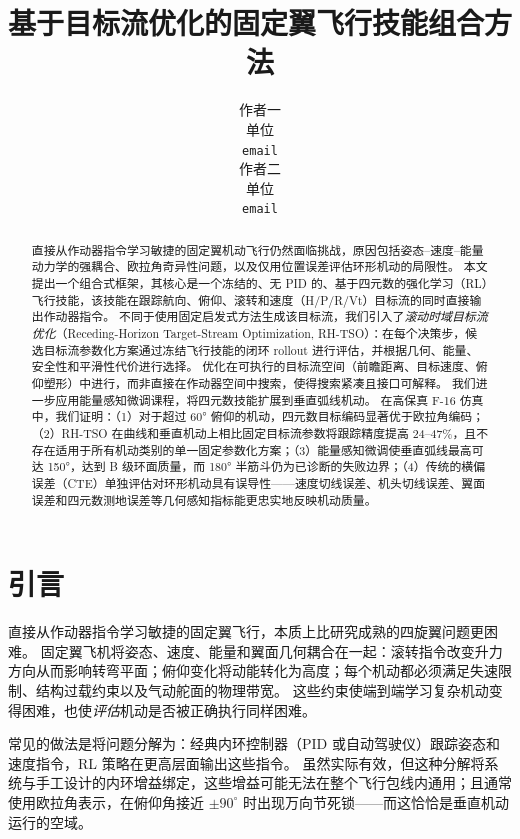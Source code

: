 \documentclass{article}
\title{基于目标流优化的固定翼飞行技能组合方法}
\author{
  作者一\\
  单位\\
  \texttt{email} \\
  \And
  作者二\\
  单位\\
  \texttt{email} \\
}
\begin{document}
\maketitle


\begin{abstract}
  直接从作动器指令学习敏捷的固定翼机动飞行仍然面临挑战，原因包括姿态--速度--能量动力学的强耦合、欧拉角奇异性问题，以及仅用位置误差评估环形机动的局限性。
  本文提出一个组合式框架，其核心是一个冻结的、无 PID 的、基于四元数的强化学习（RL）飞行技能，该技能在跟踪航向、俯仰、滚转和速度（H/P/R/Vt）目标流的同时直接输出作动器指令。
  不同于使用固定启发式方法生成该目标流，我们引入了\emph{滚动时域目标流优化}（Receding-Horizon Target-Stream Optimization, RH-TSO）：在每个决策步，候选目标流参数化方案通过冻结飞行技能的闭环 rollout 进行评估，并根据几何、能量、安全性和平滑性代价进行选择。
  优化在可执行的目标流空间（前瞻距离、目标速度、俯仰塑形）中进行，而非直接在作动器空间中搜索，使得搜索紧凑且接口可解释。
  我们进一步应用能量感知微调课程，将四元数技能扩展到垂直弧线机动。
  在高保真 F-16 仿真中，我们证明：（1）对于超过 60° 俯仰的机动，四元数目标编码显著优于欧拉角编码；（2）RH-TSO 在曲线和垂直机动上相比固定目标流参数将跟踪精度提高 24--47\%，且不存在适用于所有机动类别的单一固定参数化方案；（3）能量感知微调使垂直弧线最高可达 150°，达到 B 级环面质量，而 180° 半筋斗仍为已诊断的失败边界；（4）传统的横偏误差（CTE）单独评估对环形机动具有误导性——速度切线误差、机头切线误差、翼面误差和四元数测地误差等几何感知指标能更忠实地反映机动质量。
\end{abstract}



\section{引言}

直接从作动器指令学习敏捷的固定翼飞行，本质上比研究成熟的四旋翼问题更困难。
固定翼飞机将姿态、速度、能量和翼面几何耦合在一起：滚转指令改变升力方向从而影响转弯平面；俯仰变化将动能转化为高度；每个机动都必须满足失速限制、结构过载约束以及气动舵面的物理带宽。
这些约束使端到端学习复杂机动变得困难，也使\emph{评估}机动是否被正确执行同样困难。

常见的做法是将问题分解为：经典内环控制器（PID 或自动驾驶仪）跟踪姿态和速度指令，RL 策略在更高层面输出这些指令。
虽然实际有效，但这种分解将系统与手工设计的内环增益绑定，这些增益可能无法在整个飞行包线内通用；且通常使用欧拉角表示，在俯仰角接近 $\pm90^\circ$ 时出现万向节死锁——而这恰恰是垂直机动运行的空域。
\end{document}
